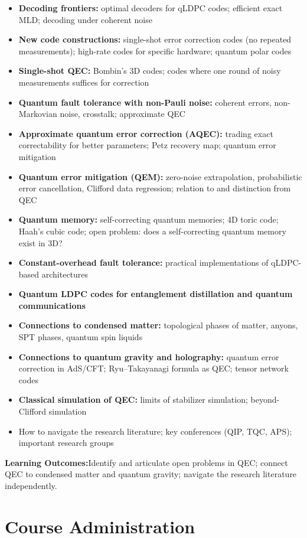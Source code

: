 \documentclass[12pt,oneside]{article}
\newcommand{\topics}[1]{%
  \begin{itemize}[leftmargin=1.5em,itemsep=1.5pt,topsep=3pt,parsep=0pt]
    #1
  \end{itemize}\vspace{2pt}
}
\newcommand{\T}[1]{\item #1}
\newcommand{\keybox}[1]{%
  \begin{tcolorbox}[
    enhanced,colback=lightgray,colframe=rulegray,
    arc=2pt,left=8pt,right=8pt,top=5pt,bottom=5pt,boxrule=0.4pt,
    fontupper=\small
  ]
    \textbf{\color{primary}Learning Outcomes:\enspace}#1
  \end{tcolorbox}\vspace{4pt}
}
\begin{document}
\topics{
  \T{\textbf{Decoding frontiers:} optimal decoders for qLDPC codes; efficient exact MLD; decoding under coherent noise}
  \T{\textbf{New code constructions:} single-shot error correction codes (no repeated measurements); high-rate codes for specific hardware; quantum polar codes}
  \T{\textbf{Single-shot QEC:} Bombin's 3D codes; codes where one round of noisy measurements suffices for correction}
  \T{\textbf{Quantum fault tolerance with non-Pauli noise:} coherent errors, non-Markovian noise, crosstalk; approximate QEC}
  \T{\textbf{Approximate quantum error correction (AQEC):} trading exact correctability for better parameters; Petz recovery map; quantum error mitigation}
  \T{\textbf{Quantum error mitigation (QEM):} zero-noise extrapolation, probabilistic error cancellation, Clifford data regression; relation to and distinction from QEC}
  \T{\textbf{Quantum memory:} self-correcting quantum memories; 4D toric code; Haah's cubic code; open problem: does a self-correcting quantum memory exist in 3D?}
  \T{\textbf{Constant-overhead fault tolerance:} practical implementations of qLDPC-based architectures}
  \T{\textbf{Quantum LDPC codes for entanglement distillation and quantum communications}}
  \T{\textbf{Connections to condensed matter:} topological phases of matter, anyons, SPT phases, quantum spin liquids}
  \T{\textbf{Connections to quantum gravity and holography:} quantum error correction in AdS/CFT; Ryu--Takayanagi formula as QEC; tensor network codes}
  \T{\textbf{Classical simulation of QEC:} limits of stabilizer simulation; beyond-Clifford simulation}
  \T{How to navigate the research literature; key conferences (QIP, TQC, APS); important research groups}
}

\keybox{Identify and articulate open problems in QEC; connect QEC to condensed matter and quantum gravity; navigate the research literature independently.}

\newpage


\section*{Course Administration}
\end{document}
